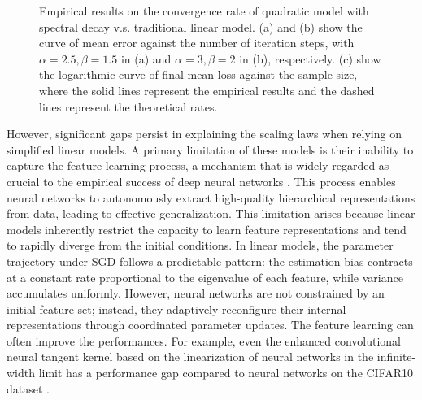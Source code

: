 \begin{figure}[t]
\centering


%
%
%
\centering
\caption{Empirical results on the convergence rate of quadratic model with spectral decay v.s. traditional linear model. (a) and (b) show the curve of mean error against the number of iteration steps, with $\alpha = 2.5, \beta = 1.5$ in (a) and $\alpha =3,\beta=2$ in (b), respectively. (c) show the logarithmic curve of final mean loss against the sample size, where the solid lines represent the empirical results and the dashed lines represent the theoretical rates. }
\label{experiment1}
\end{figure}








However, significant gaps persist in explaining the scaling laws when relying on simplified linear models. A primary limitation of these models is their inability to capture the feature learning process, a mechanism that is widely regarded as crucial to the empirical success of deep neural networks \citep{lecun2015deep}. This process enables neural networks to autonomously extract high-quality hierarchical representations from data, leading to effective generalization. This limitation arises because linear models inherently restrict the capacity to learn feature representations and tend to rapidly diverge from the initial conditions. In linear models, the parameter trajectory under SGD follows a predictable pattern: the estimation bias contracts at a constant rate proportional to the eigenvalue of each feature, while variance accumulates uniformly. However, neural networks are not constrained by an initial feature set; instead, they adaptively reconfigure their internal representations through coordinated parameter updates. The feature learning can often improve the performances. For example,  even the enhanced convolutional neural tangent kernel based on the linearization of neural networks in the infinite-width limit has a performance gap compared to neural networks on the CIFAR10 dataset \citep{li2019enhanced}.

